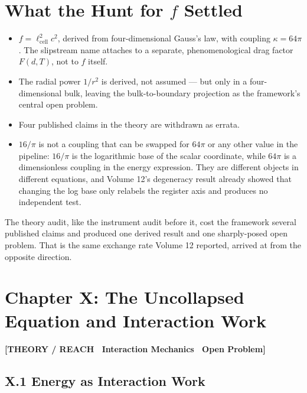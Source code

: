\documentclass[11pt, letterpaper, openany]{book}
\begin{document}
\section{What the Hunt for $f$ Settled}

\begin{itemize}
    \item $f = \ell_{\mathrm{cell}}^2 c^2$, derived from four-dimensional Gauss's law, with
          coupling $\kappa = 64\pi$. The slipstream name attaches to a separate, phenomenological
          drag factor $F(d,T)$, not to $f$ itself.
    \item The radial power $1/r^2$ is derived, not assumed --- but only in a four-dimensional
          bulk, leaving the bulk-to-boundary projection as the framework's central open problem.
    \item Four published claims in the theory are withdrawn as errata.
    \item $16/\pi$ is not a coupling that can be swapped for $64\pi$ or any other value in the
          pipeline: $16/\pi$ is the logarithmic base of the scalar coordinate, while $64\pi$ is a
          dimensionless coupling in the energy expression. They are different objects in different
          equations, and Volume 12's degeneracy result already showed that changing the log base
          only relabels the register axis and produces no independent test.
\end{itemize}

\noindent The theory audit, like the instrument audit before it, cost the framework several
published claims and produced one derived result and one sharply-posed open problem. That is the
same exchange rate Volume 12 reported, arrived at from the opposite direction.

\section*{Chapter X: The Uncollapsed Equation and Interaction Work}

\begin{center}
{\color{theorytag}\textbf{[THEORY / REACH \textbullet\ Interaction Mechanics \textbullet\ Open Problem]}}
\end{center}

\subsection*{X.1 Energy as Interaction Work}
\end{document}
